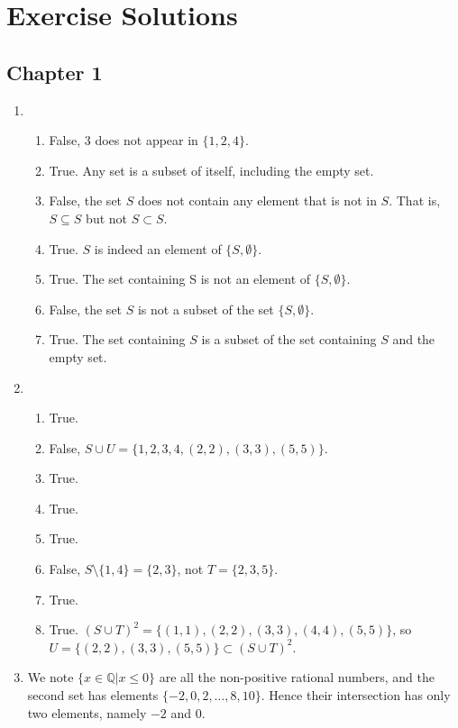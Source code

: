 \chapter*{Exercise Solutions}

\section*{Chapter 1}
\begin{enumerate}
    \item \begin{enumerate}[label=(\alph*)]
        \item False, 3 does not appear in $\{1, 2, 4\}$.
        \item True. Any set is a subset of itself, including the empty set.
        \item False, the set $S$ does not contain any element that is not in $S$. That is, $S \subseteq S$ but not $S \subset S$.
        \item True. $S$ is indeed an element of $\{S, \emptyset\}$.
        \item True. The set containing S is not an element of $\{S, \emptyset\}$.
        \item False, the set $S$ is not a subset of the set $\{S, \emptyset\}$.
        \item True. The set containing $S$ is a subset of the set containing $S$ and the empty set.
    \end{enumerate}
    
    \item \begin{enumerate}[label=(\alph*)]
        \item True.
        \item False, $S \cup U = \{1, 2, 3, 4, (2, 2), (3, 3), (5, 5)\}$.
        \item True.
        \item True.
        \item True.
        \item False, $S \setminus \{1, 4\} = \{2, 3\}$, not $T = \{2, 3, 5\}$.
        \item True.
        \item True. $(S \cup T)^2 = \{(1,1), (2,2), (3,3), (4,4), (5,5)\}$, so $U = \{(2,2), (3,3), (5,5)\} \subset (S \cup T)^2$.
    \end{enumerate}
    \item We note $\{x \in \mathbb{Q} \vert x \leq 0\}$ are all the non-positive rational numbers, and the second set has elements $\{-2, 0, 2, \dots, 8, 10\}$. Hence their intersection has only two elements, namely $-2$ and $0$.
\end{enumerate}

